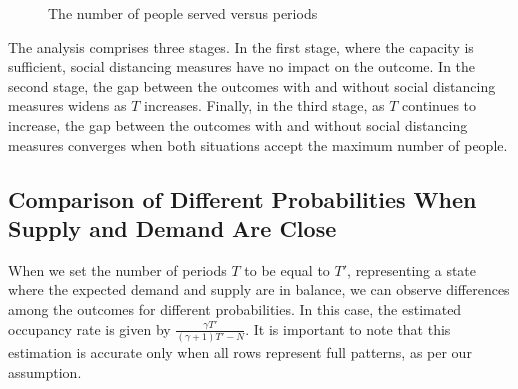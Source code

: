 \begin{figure}[h]
  \centering
  \caption{The number of people served versus periods}
  \label{Fig.lable}
\end{figure}


The analysis comprises three stages. In the first stage, where the capacity is sufficient, social distancing measures have no impact on the outcome. In the second stage, the gap between the outcomes with and without social distancing measures widens as $T$ increases. Finally, in the third stage, as $T$ continues to increase, the gap between the outcomes with and without social distancing measures converges when both situations accept the maximum number of people.

\subsection{Comparison of Different Probabilities When Supply and Demand Are Close}
When we set the number of periods $T$ to be equal to $T'$, representing a state where the expected demand and supply are in balance, we can observe differences among the outcomes for different probabilities. In this case, the estimated occupancy rate is given by $\frac{\gamma T'}{(\gamma+1)T' - N}$. It is important to note that this estimation is accurate only when all rows represent full patterns, as per our assumption.

